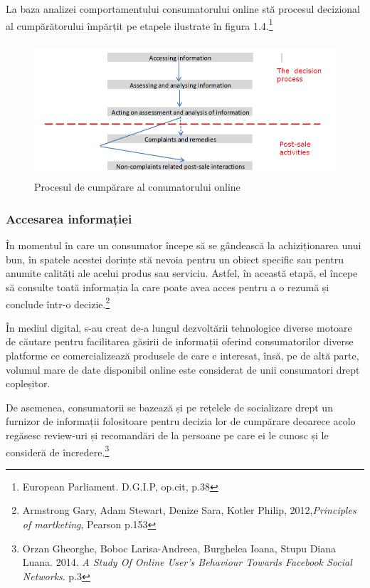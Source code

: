 \documentclass[a4paper, 12pt]{article}
\begin{document}
		\quad La baza analizei comportamentului consumatorului online stă procesul decizional al cumpărătorului împărțit pe etapele ilustrate în figura 1.4.\footnote{European Parliament. D.G.I.P, op.cit, p.38}
		\begin{figure}[!htb]
			\centering
			\includegraphics[width=12cm, height=5cm]{"figures/third.png"}
			\caption{Procesul de cumpărare al conumatorului online}\label{fig:third}
		\end{figure}
	
		\subsubsection{Accesarea informației}
		\quad\quad\space
		 În momentul în care un consumator începe să se gândească la  achiziționarea unui bun, în spatele acestei dorințe stă nevoia pentru un obiect specific sau pentru anumite calități ale acelui produs sau serviciu. Astfel, în această etapă, el începe să consulte toată informația la care poate avea acces pentru a o rezumă și conclude într-o decizie.\footnote{Armstrong Gary, Adam Stewart, Denize Sara, Kotler Philip, 2012,\textit{Principles of martketing}, Pearson p.153}
		
 		\qquad În mediul digital, s-au creat de-a lungul dezvoltării tehnologice diverse motoare de căutare pentru facilitarea găsirii de informații oferind consumatorilor diverse platforme ce comercializează produsele de care e interesat, însă, pe de altă parte, volumul mare de date disponibil online este considerat de unii consumatori drept copleșitor.
		 
	 	\quad De asemenea, consumatorii se bazează  și pe  rețelele de socializare drept un furnizor de informații folositoare pentru decizia lor de cumpărare deoarece acolo regăsesc review-uri și recomandări de la persoane pe care ei le cunosc și le consideră de încredere.\footnote{Orzan Gheorghe, Boboc Larisa-Andreea, Burghelea Ioana, Stupu Diana Luana. 2014. \textit{A Study Of Online User's Behaviour Towards Facebook Social Networks}. p.3}
		
\end{document}
